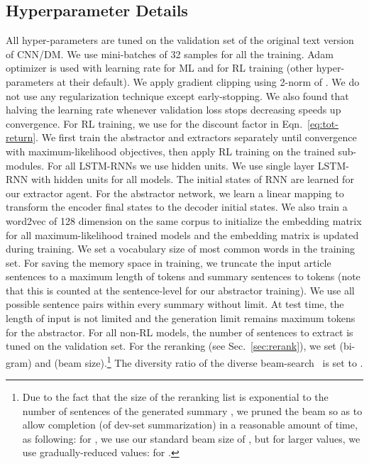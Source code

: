 \documentclass[11pt,a4paper]{article}
\def\secref#1{Sec.~\ref{#1}}
\def\eqnref#1{Eqn.~\ref{#1}}
\begin{document}
\subsection{Hyperparameter Details}
\label{sec:detail}
All hyper-parameters are tuned on the validation set of the original text version of CNN/DM.
We use mini-batches of 32 samples for all the training. 
Adam optimizer \citep{DBLP:journals/corr/KingmaB14}
is used with learning rate  for ML and  for RL training (other hyper-parameters at their default).
We apply gradient clipping \citep{pmlr-v28-pascanu13} using 2-norm of .
We do not use any regularization technique except early-stopping.
We also found that halving the learning rate whenever validation loss stops decreasing speeds up convergence.
For RL training, we use  for the discount factor in \eqnref{eq:tot-return}.
We first train the abstractor and extractors separately until convergence with 
maximum-likelihood objectives, then apply RL training on the trained sub-modules.
For all LSTM-RNNs we use  hidden units. We use single layer LSTM-RNN with  hidden units for all models.
The initial states of RNN are learned for our extractor agent.
For the abstractor network, we learn a linear mapping to 
transform the encoder final states to the decoder initial states.
We also train a word2vec \citep{NIPS2013_word2vec} of 128 dimension
on the same corpus to initialize the embedding matrix for all maximum-likelihood trained models and the embedding matrix is updated during training.
We set a vocabulary size of  most common words in the training set.
For saving the memory space in training, we truncate the input article sentences to a maximum length of  tokens and summary sentences to  tokens (note that this is counted at the sentence-level for our abstractor training).
We use all possible sentence pairs within every summary without limit.
At test time, the length of input is not limited and the generation limit remains  maximum tokens for the abstractor.
For all non-RL models, the number of sentences to extract is tuned on the validation set.
For the reranking (see \secref{sec:rerank}), we set  (bi-gram) and  (beam size).\footnote{Due to the fact that the size of the reranking list is exponential to the number of sentences of the generated summary , we pruned the beam so as to allow completion (of dev-set summarization) in a reasonable amount of time, as following: for  , we use our standard beam size of , but for larger  values, we use gradually-reduced  values:  for .}
The diversity ratio of the diverse beam-search~\cite{diverse} is set to .
\end{document}
